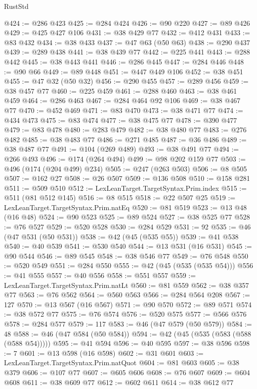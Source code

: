 \begin{lexlean}{RustStd}
\begin{coremodule}
@424 := @286 @423
@425 := @284 @424
@426 := @90 @220
@427 := @89 @426
@429 := @425 @427 @106
@431 := @38 @429 @77
@432 := @412 @431
@433 := @83 @432
@434 := @38 @433
@437 := @47 @63 (@50 @63)
@438 := @290 @437
@439 := @289 @438
@441 := @38 @439 @77
@442 := @225 @441
@443 := @288 @442
@445 := @38 @443 @441
@446 := @286 @445
@447 := @284 @446
@448 := @90 @66
@449 := @89 @448
@451 := @447 @449 @106
@452 := @38 @451
@455 := @47 @32 (@50 @32)
@456 := @290 @455
@457 := @289 @456
@459 := @38 @457 @77
@460 := @225 @459
@461 := @288 @460
@463 := @38 @461 @459
@464 := @286 @463
@467 := @284 @464 @92 @106
@469 := @38 @467 @77
@470 := @452 @469
@471 := @83 @470
@473 := @38 @471 @77
@474 := @434 @473
@475 := @83 @474
@477 := @38 @475 @77
@478 := @390 @477
@479 := @83 @478
@480 := @283 @479
@482 := @38 @480 @77
@483 := @276 @482
@485 := @38 @483 @77
@486 := @271 @485
@487 := @36 @486
@489 := @38 @487 @77
@491 := @104 (@269 @489)
@493 := @38 @491 @77
@494 := @266 @493
@496 := @174 (@264 @494)
@499 := @98 @202 @159 @77
@503 := @496 (@174 (@204 @499) @234)
@505 := @247 (@263 @503)
@506 := @8 @505
@507 := @162 @27
@508 := @26 @507
@509 := @136 @508
@510 := @158 @281
@511 := @509 @510
@512 := LexLeanTarget.TargetSyntax.Prim.index
@515 := @511 (@81 @512 @145)
@516 := @8 @515
@518 := @22 @507 @25
@519 := LexLeanTarget.TargetSyntax.Prim.natEq
@520 := @81 @519
@523 := @13 @48 (@16 @48)
@524 := @90 @523
@525 := @89 @524
@527 := @38 @525 @77
@528 := @76 @527
@529 := @520 @528
@530 := @284 @529
@531 := 92
@535 := @46 (@47 @531 (@50 @531))
@538 := @42 (@45 (@535 @55))
@539 := @41 @538
@540 := @40 @539
@541 := @530 @540
@544 := @13 @531 (@16 @531)
@545 := @90 @544
@546 := @89 @545
@548 := @38 @546 @77
@549 := @76 @548
@550 := @520 @549
@551 := @284 @550
@555 := @42 (@45 (@535 (@535 @54)))
@556 := @41 @555
@557 := @40 @556
@558 := @551 @557
@559 := LexLeanTarget.TargetSyntax.Prim.natLt
@560 := @81 @559
@562 := @38 @357 @77
@563 := @76 @562
@564 := @560 @563
@566 := @284 @564 @208
@567 := 127
@570 := @13 @567 (@16 @567)
@571 := @90 @570
@572 := @89 @571
@574 := @38 @572 @77
@575 := @76 @574
@576 := @520 @575
@577 := @566 @576
@578 := @284 @577
@579 := 117
@583 := @46 (@47 @579 (@50 @579))
@584 := 48
@588 := @46 (@47 @584 (@50 @584))
@594 := @42 (@45 (@535 (@583 (@588 (@588 @54)))))
@595 := @41 @594
@596 := @40 @595
@597 := @38 @596
@598 := 7
@601 := @13 @598 (@16 @598)
@602 := @31 @601
@603 := LexLeanTarget.TargetSyntax.Prim.natQuot
@604 := @81 @603
@605 := @38 @379
@606 := @107 @77
@607 := @605 @606
@608 := @76 @607
@609 := @604 @608
@611 := @38 @609 @77
@612 := @602 @611
@614 := @38 @612 @77

\end{coremodule}
\end{lexlean}
